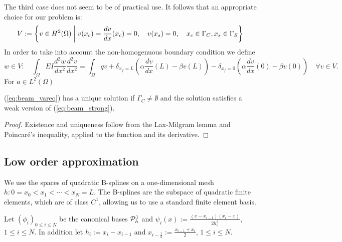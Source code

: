 %
The third case does not seem to be of practical use.
It follows that an appropriate choice for our problem is:
%
\begin{equation}\label{eq:beam_V}
V:= \left\{v\in H^2(\Omega)\;\middle|\;v(x_c)=\frac{d v}{dx}(x_c)=0, \quad v(x_s)=0,\quad x_c\in\Gamma_C,x_s\in\Gamma_S\right\}
\end{equation}
%
%
In order to take into account the non-homogenuous boundary condition we define
%
\begin{equation}\label{eq:beam_vareq2}
w\in V:\quad \int_{\Omega} EI \frac{d^2 w}{dx^2}\frac{d^2 v}{dx^2}= \int_{\Omega} qv + 
\delta_{x_f=L}(\alpha\frac{d v}{dx}(L) - \beta v(L)) - \delta_{x_f=0}(\alpha\frac{d v}{dx}(0) - \beta v(0))\quad \forall v\in V.
\end{equation}
%
%
For $a\in L^2(\Omega)$
\begin{proposition}\label{prop:}
(\ref{eq:beam_vareq}) has a unique solution if $\Gamma_C\ne\emptyset$ and the solution satisfies a weak version of 
(\ref{eq:beam_strong}).
\end{proposition}
\begin{proof}
Existence and uniqueness follow from the Lax-Milgram lemma and Poincaré's inequality, applied to the function and its derivative.
\end{proof}
%
%
\subsection{Low order approximation}\label{subsec:}
%
We use the spaces of quadratic B-splines on a one-dimensional mesh $h:0=x_0<x_1<\cdots< x_N=L$. 
The B-splines are the subspace of quadratic finite elements, which are of class $C^1$, allowing us to use a  
standard finite element basis. 

Let $(\phi_i)_{0\le i\le N}$ be the canonical bases $\mathcal{P}^1_h$ and $\psi_i(x):=\frac{(x-x_{i-1})(x_i-x)}{2h_i^2}$, $1\le i\le N$.
In addition let $h_i:=x_i-x_{i-1}$ and $x_{i-\frac12}:= \frac{x_{i-1}+x_{i}}{2}$, $1\le i\le N$.

